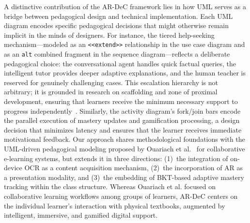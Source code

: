A distinctive contribution of the AR-DeC framework lies in how UML serves as a bridge between pedagogical design and technical implementation. Each UML diagram encodes specific pedagogical decisions that might otherwise remain implicit in the minds of designers. For instance, the tiered help-seeking mechanism---modeled as an \texttt{<<extend>>} relationship in the use case diagram and as an \texttt{alt} combined fragment in the sequence diagram---reflects a deliberate pedagogical choice: the conversational agent handles quick factual queries, the intelligent tutor provides deeper adaptive explanations, and the human teacher is reserved for genuinely challenging cases. This escalation hierarchy is not arbitrary; it is grounded in research on scaffolding and zone of proximal development, ensuring that learners receive the minimum necessary support to progress independently~\cite{VanLehn2011}. Similarly, the activity diagram's fork/join bars encode the parallel execution of mastery updates and gamification processing, a design decision that minimizes latency and ensures that the learner receives immediate motivational feedback. Our approach shares methodological foundations with the UML-driven pedagogical modeling proposed by Ouariach et al.~\cite{Ouariach2023,Ouariach2025,Ouariach2026} for collaborative e-learning systems, but extends it in three directions: (1)~the integration of on-device OCR as a content acquisition mechanism, (2)~the incorporation of AR as a presentation modality, and (3)~the embedding of BKT-based adaptive mastery tracking within the class structure. Whereas Ouariach et al. focused on collaborative learning workflows among groups of learners, AR-DeC centers on the individual learner's interaction with physical textbooks, augmented by intelligent, immersive, and gamified digital support.

